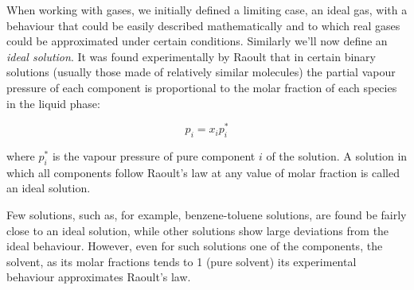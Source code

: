 \documentclass[12pt,a4paper]{report}
\newif\ifstudents
\begin{document}
   When working with gases, we initially defined a limiting case, an ideal gas, with a behaviour that could be easily described mathematically and to which real gases could be approximated under certain conditions. Similarly we'll now define an \textit{ideal solution}.
   It was found experimentally by Raoult that in certain binary solutions (usually those made of relatively similar molecules) the partial vapour pressure of each component is proportional to the molar fraction of each species in the liquid phase:
   \ifstudents \hideit[2]{ \fi
   \begin{equation*}
   p_{i}=x_{i}p^{*}_{i}
   \end{equation*}
   \ifstudents } \fi
   where $p^{*}_{i}$ is the vapour pressure of pure component $i$ of the solution. A solution in which all components follow Raoult's law at any value of molar fraction is called an ideal solution.
   \begin{center}
   \end{center}
   Few solutions, such as, for example, benzene-toluene solutions, are found be fairly close to an ideal solution, while other solutions show large deviations from the ideal behaviour. However, even for such solutions one of the components, the solvent, as its molar fractions tends to 1 (pure solvent) its experimental behaviour approximates Raoult's law.
   
\end{document}
